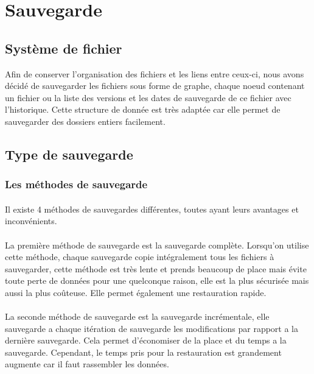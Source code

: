 \section{Sauvegarde}
    
    
    \subsection{Système de fichier}
        Afin de conserver l'organisation des fichiers et les liens entre ceux-ci, nous avons décidé de sauvegarder les fichiers sous forme de graphe, chaque noeud contenant un fichier ou la liste des versions et les dates de sauvegarde de ce fichier avec l'historique. Cette structure de donnée est très adaptée car elle permet de sauvegarder des dossiers entiers facilement.
        
    \subsection{Type de sauvegarde}
        
        
        \subsubsection*{Les méthodes de sauvegarde}
            \paragraph*{}
            Il existe 4 méthodes de sauvegardes différentes, toutes ayant leurs avantages et inconvénients.
            \paragraph*{}
            La première méthode de sauvegarde est la sauvegarde complète. Lorsqu'on utilise cette méthode, chaque sauvegarde copie intégralement tous les fichiers à sauvegarder, cette méthode est très lente et prends beaucoup de place mais évite toute perte de données pour une quelconque raison, elle est la plus sécurisée mais aussi la plus coûteuse. Elle permet également une restauration rapide.
            \paragraph*{}
            La seconde méthode de sauvegarde est la sauvegarde incrémentale, elle sauvegarde a chaque itération de sauvegarde les modifications par rapport a la dernière sauvegarde. Cela permet d'économiser de la place et du temps a la sauvegarde. Cependant, le temps pris pour la restauration est grandement augmente car il faut rassembler les données.
